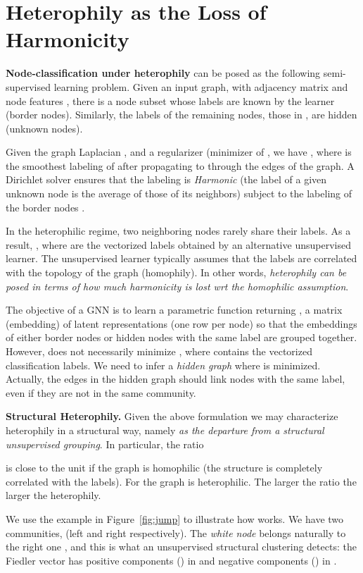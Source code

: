 \documentclass{article}
\theoremstyle{plain}
\theoremstyle{definition}
\begin{document}
\section{Heterophily as the Loss of Harmonicity}\label{sec:2}\textbf{Node-classification under heterophily} can be posed as the following semi-supervised learning problem. Given an input graph,  with adjacency matrix  and node features , there is a node subset  whose labels  are known by the learner (border nodes). Similarly, the labels  of the remaining nodes, those in , are hidden (unknown nodes). 

Given the graph Laplacian , and a regularizer (minimizer of , we have , where  is the smoothest labeling of  after propagating  to  through the edges of the graph. A Dirichlet solver ensures that the labeling  is \emph{Harmonic} (the label of a given unknown node is the average of those of its neighbors) subject to the labeling of the border nodes .

In the heterophilic regime, two neighboring nodes rarely share their labels. As a result, , where  are the vectorized labels obtained by an alternative unsupervised learner. The unsupervised learner typically assumes that the labels  are correlated with the topology of the graph (homophily). In other words, \emph{heterophily can be posed in terms of how much harmonicity is lost wrt the homophilic assumption}.  

The objective of a GNN is to learn a parametric function  returning , a matrix (embedding) of latent representations (one row per node) so that the embeddings of either border nodes or hidden nodes with the same label are grouped together. However,  does not necessarily minimize , where  contains the vectorized classification labels. We need to infer a \emph{hidden graph}  where  is minimized. Actually, the edges  in the hidden graph should link nodes with the same label, even if they are not in the same community. 

\textbf{Structural Heterophily.} Given the above formulation we may characterize heterophily in a structural way, namely \emph{as the departure from a structural unsupervised grouping}. In particular, the ratio 

 is close to the unit if the graph is homophilic (the structure is completely correlated with the labels). For  the graph is  heterophilic. The larger the ratio the larger the heterophily. 

We use the example in Figure~\ref{fig:jump} to illustrate how  works. We have two  communities,  (left and right respectively). The \emph{white node} belongs naturally to the right one , and this is what an unsupervised structural clustering detects: the Fiedler vector  has positive components () in  and negative components () in . 
\end{document}
